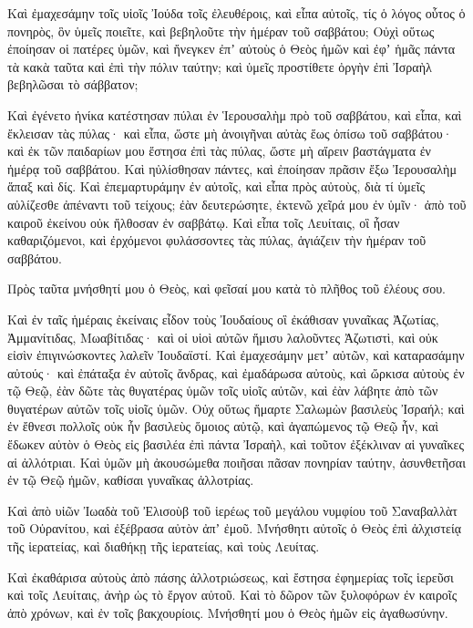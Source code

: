 {Καὶ ἐμαχεσάμην τοῖς υἱοῖς Ἰούδα τοῖς ἐλευθέροις, καὶ εἶπα αὐτοῖς, τίς ὁ λόγος οὗτος ὁ πονηρὸς, ὃν ὑμεῖς ποιεῖτε, καὶ βεβηλοῦτε τὴν ἡμέραν τοῦ σαββάτου;
Οὐχὶ οὕτως ἐποίησαν οἱ πατέρες ὑμῶν, καὶ ἤνεγκεν ἐπʼ αὐτοὺς ὁ Θεὸς ἡμῶν καὶ ἐφʼ ἡμᾶς πάντα τὰ κακὰ ταῦτα καὶ ἐπὶ τὴν πόλιν ταύτην; καὶ ὑμεῖς προστίθετε ὀργὴν ἐπὶ Ἰσραὴλ βεβηλῶσαι τὸ σάββατον;
\par }{\PP {}Καὶ ἐγένετο ἡνίκα κατέστησαν πύλαι ἐν Ἱερουσαλὴμ πρὸ τοῦ σαββάτου, καὶ εἶπα, καὶ ἔκλεισαν τὰς πύλας· καὶ εἶπα, ὥστε μὴ ἀνοιγῆναι αὐτὰς ἕως ὀπίσω τοῦ σαββάτου· καὶ ἐκ τῶν παιδαρίων μου ἔστησα ἐπὶ τὰς πύλας, ὥστε μὴ αἴρειν βαστάγματα ἐν ἡμέρᾳ τοῦ σαββάτου.
Καὶ ηὐλίσθησαν πάντες, καὶ ἐποίησαν πρᾶσιν ἔξω Ἰερουσαλὴμ ἅπαξ καὶ δίς.
Καὶ ἐπεμαρτυράμην ἐν αὐτοῖς, καὶ εἶπα πρὸς αὐτοὺς, διὰ τί ὑμεῖς αὐλίζεσθε ἀπέναντι τοῦ τείχους; ἐὰν δευτερώσητε, ἐκτενῶ χεῖρά μου ἐν ὑμῖν· ἀπὸ τοῦ καιροῦ ἐκείνου οὐκ ἤλθοσαν ἐν σαββάτῳ.
Καὶ εἶπα τοῖς Λευίταις, οἳ ἦσαν καθαριζόμενοι, καὶ ἐρχόμενοι φυλάσσοντες τὰς πύλας, ἁγιάζειν τὴν ἡμέραν τοῦ σαββάτου.
\par }{\PP Πρὸς ταῦτα μνήσθητί μου ὁ Θεὸς, καὶ φεῖσαί μου κατὰ τὸ πλῆθος τοῦ ἐλέους σου.
\par }{\PP {}Καὶ ἐν ταῖς ἡμέραις ἐκείναις εἶδον τοὺς Ἰουδαίους οἳ ἐκάθισαν γυναῖκας Ἀζωτίας, Ἀμμανίτιδας, Μωαβίτιδας·
καὶ οἱ υἱοὶ αὐτῶν ἥμισυ λαλοῦντες Ἀζωτιστὶ, καὶ οὐκ εἰσὶν ἐπιγινώσκοντες λαλεῖν Ἰουδαϊστί.
Καὶ ἐμαχεσάμην μετʼ αὐτῶν, καὶ καταρασάμην αὐτούς· καὶ ἐπάταξα ἐν αὐτοῖς ἄνδρας, καὶ ἐμαδάρωσα αὐτοὺς, καὶ ὤρκισα αὐτοὺς ἐν τῷ Θεῷ, ἐὰν δῶτε τὰς θυγατέρας ὑμῶν τοῖς υἱοῖς αὐτῶν, καὶ ἐὰν λάβητε ἀπὸ τῶν θυγατέρων αὐτῶν τοῖς υἱοῖς ὑμῶν.
Οὐχ οὕτως ἥμαρτε Σαλωμὼν βασιλεὺς Ἰσραήλ; καὶ ἐν ἔθνεσι πολλοῖς οὐκ ἦν βασιλεὺς ὅμοιος αὐτῷ, καὶ ἀγαπώμενος τῷ Θεῷ ἦν, καὶ ἔδωκεν αὐτὸν ὁ Θεὸς εἰς βασιλέα ἐπὶ πάντα Ἰσραὴλ, καὶ τοῦτον ἐξέκλιναν αἱ γυναῖκες αἱ ἀλλότριαι.
Καὶ ὑμῶν μὴ ἀκουσώμεθα ποιῆσαι πᾶσαν πονηρίαν ταύτην, ἀσυνθετῆσαι ἐν τῷ Θεῷ ἡμῶν, καθίσαι γυναῖκας ἀλλοτρίας.
\par }{\PP {}Καὶ ἀπὸ υἱῶν Ἰωαδὰ τοῦ Ἐλισοὺβ τοῦ ἱερέως τοῦ μεγάλου νυμφίου τοῦ Σαναβαλλὰτ τοῦ Οὐρανίτου, καὶ ἐξέβρασα αὐτὸν ἀπʼ ἐμοῦ.
Μνήσθητι αὐτοῖς ὁ Θεὸς ἐπὶ ἀλχιστείᾳ τῆς ἱερατείας, καὶ διαθήκῃ τῆς ἱερατείας, καὶ τοὺς Λευίτας.
\par }{\PP {}Καὶ ἐκαθάρισα αὐτοὺς ἀπὸ πάσης ἀλλοτριώσεως, καὶ ἔστησα ἐφημερίας τοῖς ἱερεῦσι καὶ τοῖς Λευίταις, ἀνὴρ ὡς τὸ ἔργον αὐτοῦ.
Καὶ τὸ δῶρον τῶν ξυλοφόρων ἐν καιροῖς ἀπὸ χρόνων, καὶ ἐν τοῖς βακχουρίοις. Μνήσθητί μου ὁ Θεὸς ἡμῶν εἰς ἀγαθωσύνην.
\par }